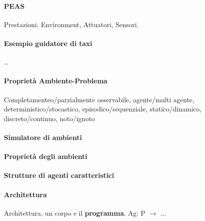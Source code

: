 \documentclass[10pt]{book}
\begin{document}
\paragraph{PEAS} Prestazioni, Environment, Attuatori, Sensori.
\paragraph{Esempio guidatore di taxi} \ldots
\paragraph{Proprietà Ambiente-Problema} Completamenteo/parzialmente osservabile, agente/multi agente, deterministico/stocastico, episodico/sequenziale, statico/dinamico, discreto/continuo, noto/ignoto
\paragraph{Simulatore di ambienti}
\paragraph{Proprietà degli ambienti}
\paragraph{Strutture di agenti caratteristici}
\paragraph{Architettura} Architettura, un corpo e il \textbf{programma}. Ag: P $\longrightarrow$ ...\\
\end{document}
